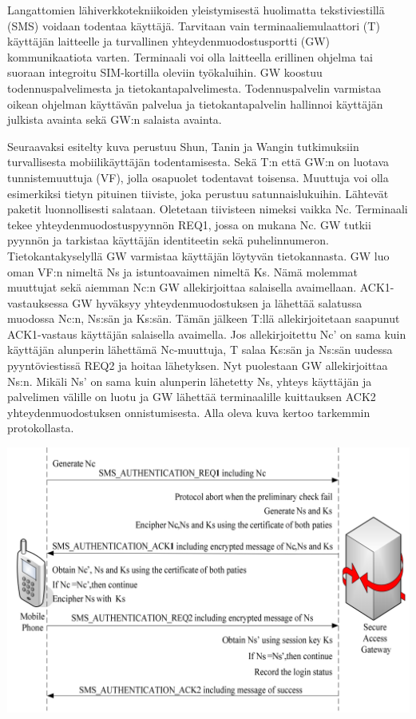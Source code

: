 \documentclass[finnish]{tktltiki2}
\theoremstyle{definition}
\theoremstyle{remark}
\begin{document}
Langattomien lähiverkkotekniikoiden yleistymisestä huolimatta tekstiviestillä (SMS) voidaan todentaa käyttäjä. Tarvitaan vain terminaaliemulaattori (T) käyttäjän laitteelle ja turvallinen yhteydenmuodostusportti (GW) kommunikaatiota varten. Terminaali voi olla laitteella erillinen ohjelma tai suoraan integroitu SIM-kortilla oleviin työkaluihin. GW koostuu todennuspalvelimesta ja tietokantapalvelimesta. Todennuspalvelin varmistaa oikean ohjelman käyttävän palvelua ja tietokantapalvelin hallinnoi käyttäjän julkista avainta sekä GW:n salaista avainta.

Seuraavaksi esitelty kuva perustuu Shun, Tanin ja Wangin \cite{sms} tutkimuksiin turvallisesta mobiilikäyttäjän todentamisesta. Sekä T:n että GW:n on luotava tunnistemuuttuja (VF), jolla osapuolet todentavat toisensa. Muuttuja voi olla esimerkiksi tietyn pituinen tiiviste, joka perustuu satunnaislukuihin. Lähtevät paketit luonnollisesti salataan. Oletetaan tiivisteen nimeksi vaikka Nc. Terminaali tekee yhteydenmuodostuspyynnön REQ1, jossa on mukana Nc. GW tutkii pyynnön ja tarkistaa käyttäjän identiteetin sekä puhelinnumeron. Tietokantakyselyllä GW varmistaa käyttäjän löytyvän tietokannasta. GW luo oman VF:n nimeltä Ns ja istuntoavaimen nimeltä Ks. Nämä molemmat muuttujat sekä aiemman Nc:n GW allekirjoittaa salaisella avaimellaan. ACK1-vastauksessa GW hyväksyy yhteydenmuodostuksen ja lähettää salatussa muodossa Nc:n, Ns:sän ja Ks:sän. Tämän jälkeen T:llä allekirjoitetaan saapunut ACK1-vastaus käyttäjän salaisella avaimella. Jos allekirjoitettu Nc' on sama kuin käyttäjän alunperin lähettämä Nc-muuttuja, T salaa Ks:sän ja Ns:sän uudessa pyyntöviestissä REQ2 ja hoitaa lähetyksen. Nyt puolestaan GW allekirjoittaa Ns:n. Mikäli Ns' on sama kuin alunperin lähetetty Ns, yhteys käyttäjän ja palvelimen välille on luotu ja GW lähettää terminaalille kuittauksen ACK2 yhteydenmuodostuksen onnistumisesta. Alla oleva kuva kertoo tarkemmin protokollasta.   

\includegraphics[scale=0.4]{sms-todennus}
\end{document}
